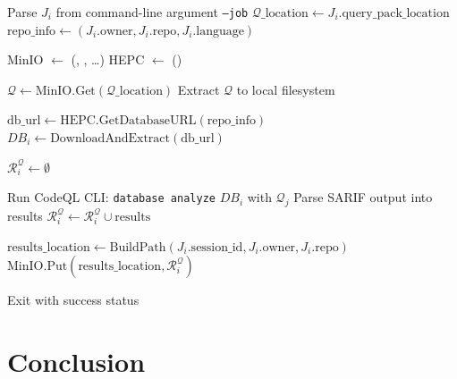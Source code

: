 \documentclass[11pt]{article}
\begin{document}
\begin{algorithmic}[1]

      \State {}
      \State Parse $J_i$ from command-line argument \texttt{--job}
      \State $\mathcal{Q}\_\text{location} \gets J_i.\text{query\_pack\_location}$
      \State $\text{repo\_info} \gets (J_i.\text{owner}, J_i.\text{repo}, J_i.\text{language})$

      \State {}
      \State MinIO $\gets$ (, , \ldots)
      \State HEPC $\gets$ ()

      \State {}
      \State $\mathcal{Q} \gets \text{MinIO}.\text{Get}(\mathcal{Q}\_\text{location})$
      \State Extract $\mathcal{Q}$ to local filesystem

      \State {}
      \State $\text{db\_url} \gets \text{HEPC}.\text{GetDatabaseURL}(\text{repo\_info})$
      \State $DB_i \gets \text{DownloadAndExtract}(\text{db\_url})$

      \State {}
      \State $\mathcal{R}_i^{\mathcal{Q}} \gets \emptyset$

        \State Run CodeQL CLI: \texttt{database analyze} $DB_i$ with $\mathcal{Q}_j$
        \State Parse SARIF output into results
        \State $\mathcal{R}_i^{\mathcal{Q}} \gets \mathcal{R}_i^{\mathcal{Q}} \cup \text{results}$
      \EndFor

      \State {}
      \State $\text{results\_location} \gets \text{BuildPath}(J_i.\text{session\_id}, J_i.\text{owner}, J_i.\text{repo})$
      \State $\text{MinIO}.\text{Put}(\text{results\_location}, \mathcal{R}_i^{\mathcal{Q}})$

      \State {}
      \State Exit with success status

    \EndProcedure
\end{algorithmic}

\section{Conclusion}
\end{document}
